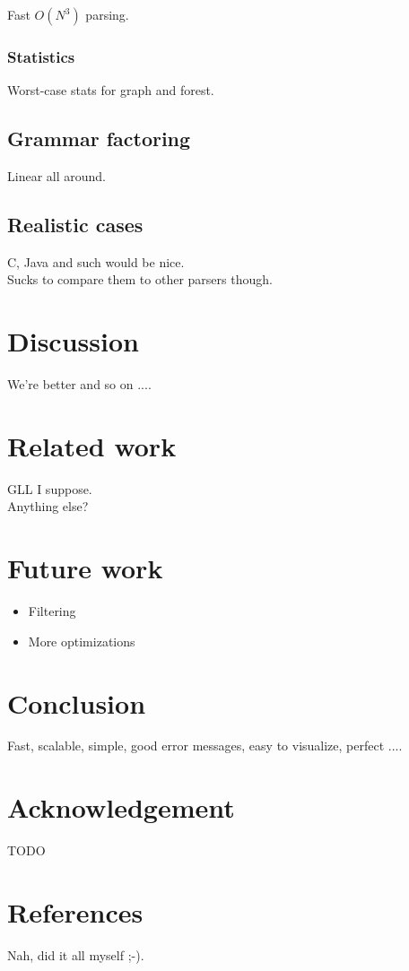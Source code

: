 \documentclass[a4paper,10pt]{article}
\begin{document}
Fast $O(N^3)$ parsing.

\subsubsection{Statistics}

Worst-case stats for graph and forest.

\subsection{Grammar factoring}

Linear all around.

\subsection{Realistic cases}

C, Java and such would be nice.\\
Sucks to compare them to other parsers though.

\section{Discussion}

We're better and so on ....

\section{Related work}

GLL I suppose.\\
Anything else?

\section{Future work}

\begin{itemize}
 \setlength{\itemsep}{0pt}
 \setlength{\parskip}{0pt}
 \setlength{\parsep}{0pt}
 
 \item Filtering
 \item More optimizations
\end{itemize}

\section{Conclusion}

Fast, scalable, simple, good error messages, easy to visualize, perfect ....

\section{Acknowledgement}

TODO

\section{References}

Nah, did it all myself ;-).
\end{document}
